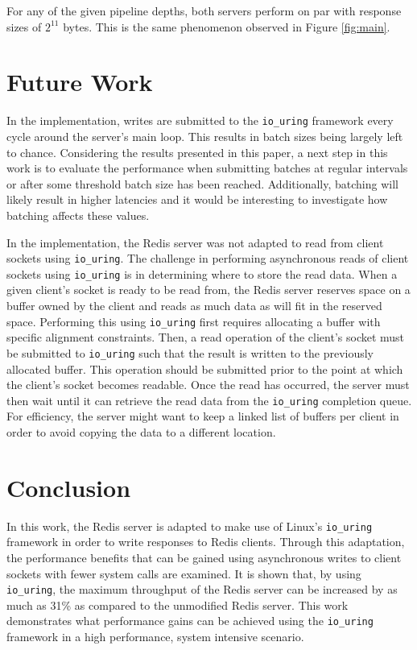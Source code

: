 \documentclass[sigconf]{acmart}
\newcommand{\inlinecode}[1]{\texttt{#1}}
\begin{document}

For any of the given pipeline depths, both servers perform on par with response sizes of $2^{11}$ bytes.
This is the same phenomenon observed in Figure \ref{fig:main}.


\section{Future Work}
In the implementation, writes are submitted to the \inlinecode{io\_uring} framework every cycle around the server's main loop.
This results in batch sizes being largely left to chance.
Considering the results presented in this paper, a next step in this work is to evaluate the performance when submitting batches at regular intervals or after some threshold batch size has been reached.
Additionally, batching will likely result in higher latencies and it would be interesting to investigate how batching affects these values.

In the implementation, the Redis server was not adapted to read from client sockets using \inlinecode{io\_uring}.
The challenge in performing asynchronous reads of client sockets using \inlinecode{io\_uring} is in determining where to store the read data.
When a given client's socket is ready to be read from, the Redis server reserves space on a buffer owned by the client and reads as much data as will fit in the reserved space.
Performing this using \inlinecode{io\_uring} first requires allocating a buffer with specific alignment constraints.
Then, a read operation of the client's socket must be submitted to 
\inlinecode{io\_uring} such that the result is written to the previously allocated buffer.
This operation should be submitted prior to the point at which the client's socket becomes readable.
Once the read has occurred, the server must then wait until it can retrieve the read data from the \inlinecode{io\_uring} completion queue.
For efficiency, the server might want to keep a linked list of buffers per client in order to avoid copying the data to a different location.

\section{Conclusion}
In this work, the Redis server is adapted to make use of Linux's \inlinecode{io\_uring} framework in order to write responses to Redis clients.
Through this adaptation, the performance benefits that can be gained using asynchronous writes to client sockets with fewer system calls are examined.
It is shown that, by using \inlinecode{io\_uring}, the maximum throughput of the Redis server can be increased by as much as 31\% as compared to the unmodified Redis server.
This work demonstrates what performance gains can be achieved using the \inlinecode{io\_uring} framework in a high performance, system intensive scenario.
\end{document}
